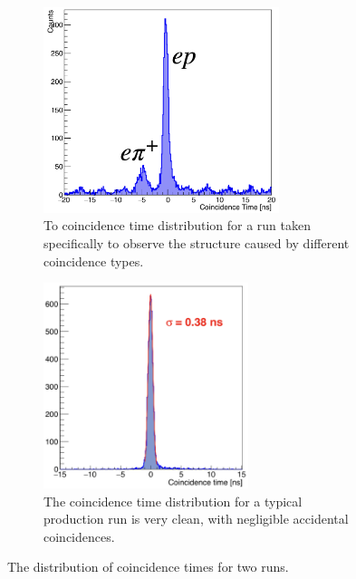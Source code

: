 \begin{figure}[ht]
    \centering
    \begin{subfigure}[b]{0.45\textwidth}
        \centering
        \includegraphics[height=6cm]{chap4/cointime_dirty.png}
        \caption{To coincidence time distribution for a run taken specifically to
                 observe the structure caused by different coincidence types.}
        \label{fig:cointime_dirty}
    \end{subfigure}
    \hfill
    \begin{subfigure}[b]{0.45\textwidth}
        \centering
        \includegraphics[height=6cm]{chap4/cointime_clean.png}
        \caption{The coincidence time distribution for a typical production run
                 is very clean, with negligible accidental coincidences.}
        \label{fig:cointime_clean}
    \end{subfigure}
    \caption{The distribution of coincidence times for two runs.}
    \label{fig:cointime}
\end{figure}


